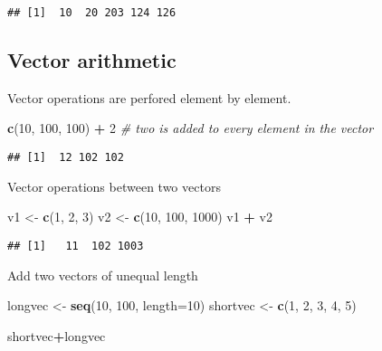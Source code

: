 \documentclass[]{book}
\newenvironment{Shaded}{\begin{snugshade}}{\end{snugshade}}
\newcommand{\CommentTok}[1]{\textcolor[rgb]{0.56,0.35,0.01}{\textit{#1}}}
\newcommand{\DataTypeTok}[1]{\textcolor[rgb]{0.13,0.29,0.53}{#1}}
\newcommand{\DecValTok}[1]{\textcolor[rgb]{0.00,0.00,0.81}{#1}}
\newcommand{\KeywordTok}[1]{\textcolor[rgb]{0.13,0.29,0.53}{\textbf{#1}}}
\newcommand{\NormalTok}[1]{#1}
\newcommand{\OperatorTok}[1]{\textcolor[rgb]{0.81,0.36,0.00}{\textbf{#1}}}
\newcommand{\StringTok}[1]{\textcolor[rgb]{0.31,0.60,0.02}{#1}}
\begin{document}
\begin{verbatim}
## [1]  10  20 203 124 126
\end{verbatim}

\hypertarget{vector-arithmetic}{%
\subsection{Vector arithmetic}\label{vector-arithmetic}}

Vector operations are perfored element by element.

\begin{Shaded}
\begin{Highlighting}[]
\KeywordTok{c}\NormalTok{(}\DecValTok{10}\NormalTok{, }\DecValTok{100}\NormalTok{, }\DecValTok{100}\NormalTok{) }\OperatorTok{+}\StringTok{ }\DecValTok{2} \CommentTok{# two is added to every element in the vector}
\end{Highlighting}
\end{Shaded}

\begin{verbatim}
## [1]  12 102 102
\end{verbatim}

Vector operations between two vectors

\begin{Shaded}
\begin{Highlighting}[]
\NormalTok{v1 <-}\StringTok{ }\KeywordTok{c}\NormalTok{(}\DecValTok{1}\NormalTok{, }\DecValTok{2}\NormalTok{, }\DecValTok{3}\NormalTok{)}
\NormalTok{v2 <-}\StringTok{ }\KeywordTok{c}\NormalTok{(}\DecValTok{10}\NormalTok{, }\DecValTok{100}\NormalTok{, }\DecValTok{1000}\NormalTok{)}
\NormalTok{v1 }\OperatorTok{+}\StringTok{ }\NormalTok{v2}
\end{Highlighting}
\end{Shaded}

\begin{verbatim}
## [1]   11  102 1003
\end{verbatim}

Add two vectors of unequal length

\begin{Shaded}
\begin{Highlighting}[]
\NormalTok{longvec <-}\StringTok{ }\KeywordTok{seq}\NormalTok{(}\DecValTok{10}\NormalTok{, }\DecValTok{100}\NormalTok{, }\DataTypeTok{length=}\DecValTok{10}\NormalTok{)}
\NormalTok{shortvec <-}\StringTok{ }\KeywordTok{c}\NormalTok{(}\DecValTok{1}\NormalTok{, }\DecValTok{2}\NormalTok{, }\DecValTok{3}\NormalTok{, }\DecValTok{4}\NormalTok{, }\DecValTok{5}\NormalTok{)}

\NormalTok{shortvec}\OperatorTok{+}\NormalTok{longvec}
\end{Highlighting}
\end{Shaded}
\end{document}

